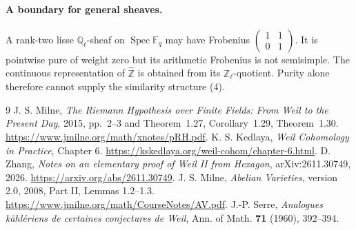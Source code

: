 \documentclass[11pt]{article}
\newcommand{\Q}{\mathbb Q}
\begin{document}
\paragraph{A boundary for general sheaves.}
A rank-two lisse \(\Q_\ell\)-sheaf on \(\operatorname{Spec}\mathbb F_q\) may have Frobenius
\(\left(\begin{smallmatrix}1&1\\0&1\end{smallmatrix}\right)\).
It is pointwise pure of weight zero but its arithmetic Frobenius is not semisimple.
The continuous representation of \(\widehat{\mathbb Z}\) is obtained
from its \(\mathbb Z_\ell\)-quotient.
Purity alone therefore cannot supply the similarity structure (4).

\begin{thebibliography}{9}\small
{}
J. S. Milne, \emph{The Riemann Hypothesis over Finite Fields: From Weil to
the Present Day}, 2015, pp.~2--3 and Theorem~1.27, Corollary~1.29,
Theorem~1.30.
\url{https://www.jmilne.org/math/xnotes/pRH.pdf}.
K. S. Kedlaya, \emph{Weil Cohomology in Practice}, Chapter 6.
\url{https://kskedlaya.org/weil-cohom/chapter-6.html}.
D. Zhang, \emph{Notes on an elementary proof of Weil II from Hexagon},
arXiv:2611.30749, 2026.
\url{https://arxiv.org/abs/2611.30749}.
J. S. Milne, \emph{Abelian Varieties}, version 2.0, 2008,
Part II, Lemmas 1.2--1.3.
\url{https://www.jmilne.org/math/CourseNotes/AV.pdf}.
J.-P. Serre, \emph{Analogues k\"ahl\'eriens de certaines conjectures de Weil},
Ann. of Math. \textbf{71} (1960), 392--394.
\end{thebibliography}
\end{document}
